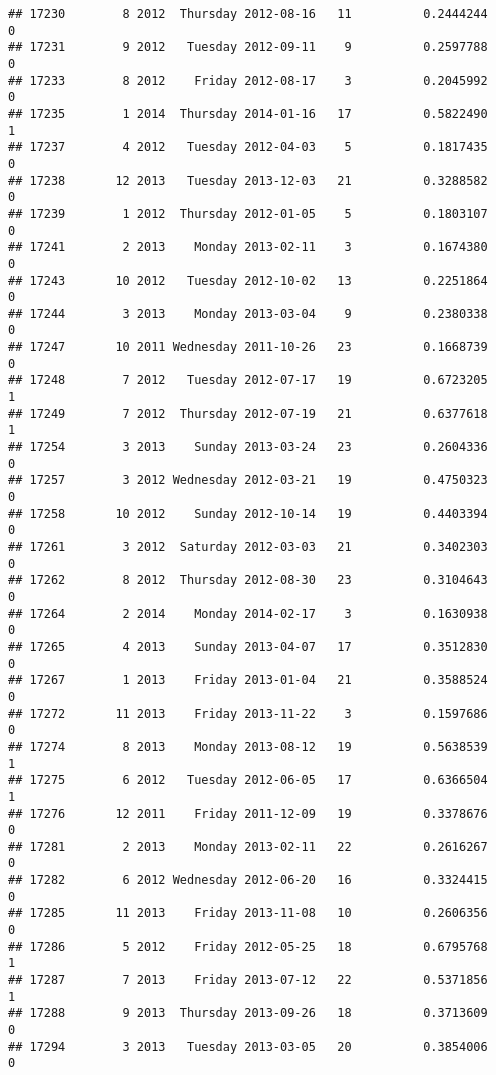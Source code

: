 \documentclass[
]{article}
\begin{document}
\begin{verbatim}
## 17230        8 2012  Thursday 2012-08-16   11          0.2444244             0
## 17231        9 2012   Tuesday 2012-09-11    9          0.2597788             0
## 17233        8 2012    Friday 2012-08-17    3          0.2045992             0
## 17235        1 2014  Thursday 2014-01-16   17          0.5822490             1
## 17237        4 2012   Tuesday 2012-04-03    5          0.1817435             0
## 17238       12 2013   Tuesday 2013-12-03   21          0.3288582             0
## 17239        1 2012  Thursday 2012-01-05    5          0.1803107             0
## 17241        2 2013    Monday 2013-02-11    3          0.1674380             0
## 17243       10 2012   Tuesday 2012-10-02   13          0.2251864             0
## 17244        3 2013    Monday 2013-03-04    9          0.2380338             0
## 17247       10 2011 Wednesday 2011-10-26   23          0.1668739             0
## 17248        7 2012   Tuesday 2012-07-17   19          0.6723205             1
## 17249        7 2012  Thursday 2012-07-19   21          0.6377618             1
## 17254        3 2013    Sunday 2013-03-24   23          0.2604336             0
## 17257        3 2012 Wednesday 2012-03-21   19          0.4750323             0
## 17258       10 2012    Sunday 2012-10-14   19          0.4403394             0
## 17261        3 2012  Saturday 2012-03-03   21          0.3402303             0
## 17262        8 2012  Thursday 2012-08-30   23          0.3104643             0
## 17264        2 2014    Monday 2014-02-17    3          0.1630938             0
## 17265        4 2013    Sunday 2013-04-07   17          0.3512830             0
## 17267        1 2013    Friday 2013-01-04   21          0.3588524             0
## 17272       11 2013    Friday 2013-11-22    3          0.1597686             0
## 17274        8 2013    Monday 2013-08-12   19          0.5638539             1
## 17275        6 2012   Tuesday 2012-06-05   17          0.6366504             1
## 17276       12 2011    Friday 2011-12-09   19          0.3378676             0
## 17281        2 2013    Monday 2013-02-11   22          0.2616267             0
## 17282        6 2012 Wednesday 2012-06-20   16          0.3324415             0
## 17285       11 2013    Friday 2013-11-08   10          0.2606356             0
## 17286        5 2012    Friday 2012-05-25   18          0.6795768             1
## 17287        7 2013    Friday 2013-07-12   22          0.5371856             1
## 17288        9 2013  Thursday 2013-09-26   18          0.3713609             0
## 17294        3 2013   Tuesday 2013-03-05   20          0.3854006             0

\end{verbatim}
\end{document}
